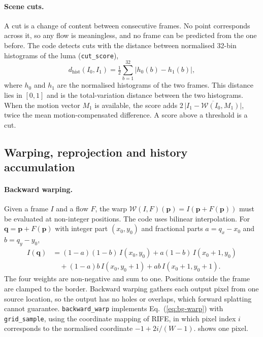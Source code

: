 \paragraph{Scene cuts.} A cut is a change of content between consecutive frames. No point corresponds across it, so any flow is meaningless, and no frame can be predicted from the one before. The code detects cuts with the distance between normalised 32-bin histograms of the luma (\texttt{cut\_score}),
\begin{equation}
d_{\text{hist}}(I_0,I_1)=\tfrac12\sum_{b=1}^{32}\big|h_0(b)-h_1(b)\big|,\label{eq:bg-cut}
\end{equation}
where $h_0$ and $h_1$ are the normalised histograms of the two frames. This distance lies in $[0,1]$ and is the total-variation distance between the two histograms. When the motion vector $M_1$ is available, the score adds $2\,\overline{|I_1-\mathcal W(I_0,M_1)|}$, twice the mean motion-compensated difference. A score above a threshold is a cut.

\subsection{Warping, reprojection and history accumulation}\label{sec:bg-warp}

\paragraph{Backward warping.} Given a frame $I$ and a flow $F$, the warp $\mathcal W(I,F)(\mathbf p)=I(\mathbf p+F(\mathbf p))$ must be evaluated at non-integer positions. The code uses bilinear interpolation. For $\mathbf q=\mathbf p+F(\mathbf p)$ with integer part $(x_0,y_0)$ and fractional parts $a=q_x-x_0$ and $b=q_y-y_0$,
\begin{equation}\begin{split}
I(\mathbf q)&=(1-a)(1-b)\,I(x_0,y_0)+a(1-b)\,I(x_0+1,y_0)\\
&\quad+(1-a)b\,I(x_0,y_0+1)+ab\,I(x_0+1,y_0+1).
\end{split}\label{eq:bg-warp}\end{equation}
The four weights are non-negative and sum to one. Positions outside the frame are clamped to the border. Backward warping gathers each output pixel from one source location, so the output has no holes or overlaps, which forward splatting cannot guarantee. \texttt{backward\_warp} implements Eq.~(\ref{eq:bg-warp}) with \texttt{grid\_sample}, using the coordinate mapping of RIFE, in which pixel index $i$ corresponds to the normalised coordinate $-1+2i/(W-1)$.  shows one pixel.

